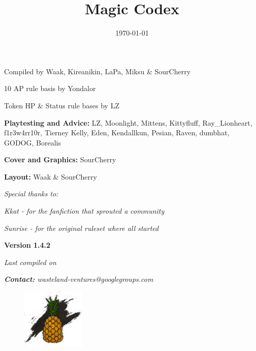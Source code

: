\documentclass[11pt,a4paper,twocolumn]{book}
\title{Magic Codex}
\date{\today}
\begin{document}
	
			
	\onecolumn
	\setcounter{page}{1}	
	\begin{center}
		Compiled by Waak, Kireanikin, LaPa, Miksu \& SourCherry
		
		10 AP rule basis by Yondalor
		
		Token HP \& Status rule bases by LZ
		
		\bigskip		
		\textbf{Playtesting and Advice:} LZ, Moonlight, Mittens, Kittyfluff, Ray\_Lionheart, f1r3w4rr10r, Tierney Kelly, Eden, Kendallkun, Pesian, Raven, dumbhat, GODOG, Borealis
		
		\bigskip
		\textbf{Cover and Graphics:} SourCherry
		
		\bigskip
		\textbf{Layout:} Waak \& SourCherry
		
		\bigskip
		\emph{	Special thanks to:}
		
		\emph{	Kkat - for the fanfiction that sprouted a community}
			
		\emph{	Sunrise - for the original ruleset where all started}
	\end{center}
	
	\vfill
	
	\begin{center}
		\textbf{Version 1.4.2}
		
		\emph{Last compiled on \thedate}
        
        \emph{\textbf{Contact:} wasteland-ventures@googlegroups.com}
     
	\end{center}	
    \begin{figure}[bp]
		\centering
		\includegraphics[width=3cm]{ART/ISA_Logo}
	\end{figure}

	\twocolumn
	\tableofcontents

%
\end{document}
